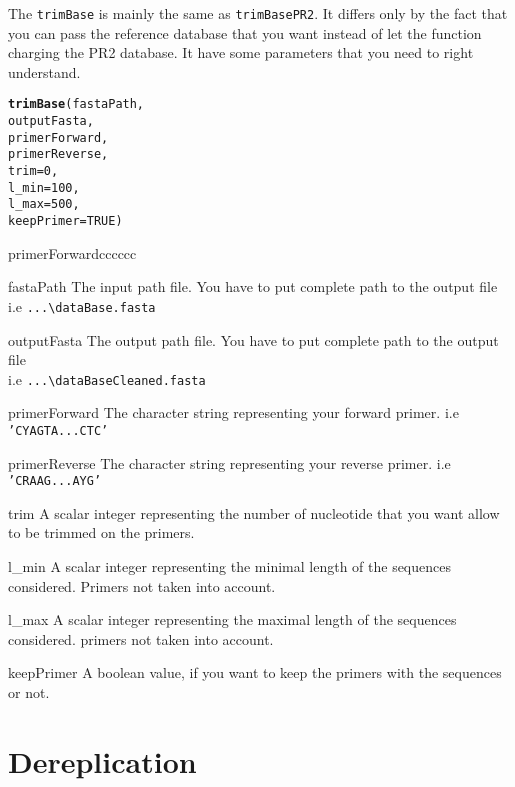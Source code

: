 \documentclass{article}\usepackage[]{graphicx}\usepackage[]{color}
\makeatletter
\newcommand{\hlnum}[1]{\textcolor[rgb]{0.686,0.059,0.569}{#1}}%
\newcommand{\hlstd}[1]{\textcolor[rgb]{0.345,0.345,0.345}{#1}}%
\newcommand{\hlkwc}[1]{\textcolor[rgb]{0.333,0.667,0.333}{#1}}%
\newcommand{\hlkwd}[1]{\textcolor[rgb]{0.737,0.353,0.396}{\textbf{#1}}}%
\newenvironment{kframe}{%
 \def\at@end@of@kframe{}%
 \ifinner\ifhmode%
  \def\at@end@of@kframe{\end{minipage}}%
  \begin{minipage}{\columnwidth}%
 \fi\fi%
 \def\FrameCommand##1{\hskip\@totalleftmargin \hskip-\fboxsep
 \colorbox{shadecolor}{##1}\hskip-\fboxsep
     \hskip-\linewidth \hskip-\@totalleftmargin \hskip\columnwidth}%
 \MakeFramed {\advance\hsize-\width
   \@totalleftmargin\z@ \linewidth\hsize
   \@setminipage}}%
 {\par\unskip\endMakeFramed%
 \at@end@of@kframe}
\newenvironment{knitrout}{}{} %
\makeatother
\begin{document}
The \texttt{trimBase} is mainly the same as \texttt{trimBasePR2}. It differs only by the fact that you can pass the reference database that you want instead of let the function charging the PR2 database. It have some parameters that you need to right understand.
\begin{knitrout}
\color{fgcolor}\begin{kframe}
\begin{alltt}
\hlkwd{trimBase}\hlstd{(fastaPath,}
        \hlstd{outputFasta,}
        \hlstd{primerForward,}
        \hlstd{primerReverse,}
        \hlkwc{trim} \hlstd{=} \hlnum{0}\hlstd{,}
        \hlkwc{l_min} \hlstd{=} \hlnum{100}\hlstd{,}
        \hlkwc{l_max} \hlstd{=} \hlnum{500}\hlstd{,}
        \hlkwc{keepPrimer} \hlstd{=} \hlnum{TRUE}\hlstd{)}
\end{alltt}
\end{kframe}
\end{knitrout}

\begin{labeling}{primerForwardcccccc}
	\item [fastaPath] The input path file. You have to put complete path to the output file\\ i.e \texttt{...\textbackslash dataBase.fasta}
	\item [outputFasta] The output path file. You have to put complete path to the output file\\ i.e \texttt{...\textbackslash dataBaseCleaned.fasta}
	\item [primerForward] The character string representing your forward primer. i.e \texttt{'CYAGTA...CTC'}
	\item [primerReverse] The character string representing your reverse primer. i.e \texttt{'CRAAG...AYG'}
	\item [trim] A scalar integer representing the number of nucleotide that you want allow to be trimmed on the primers.
	\item [l\_min] A scalar integer representing the minimal length of the sequences considered. Primers not taken into account.
	\item [l\_max] A scalar integer representing the maximal length of the sequences considered. primers not taken into account.
	\item [keepPrimer] A boolean value, if you want to keep the primers with the sequences or not.
\end{labeling}


\section{Dereplication}



\end{document}
